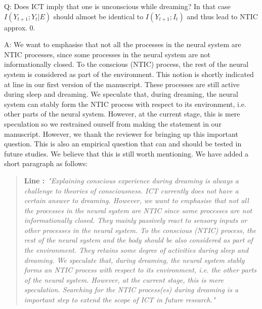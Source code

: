 \documentclass[utf8]{article}
\newcounter{cQuestion}[section]
\newenvironment{question}
    {\refstepcounter{cQuestion}\color{Blue}\noindent\newline Q\thecQuestion:}
    {~\newline}
\newenvironment{ans}  
    {\color{Black}\noindent A:}
    {~\newline}
\newcommand{\addnew}[2]{\blockcquote{}{\textbf{Line #1:}~\newline\textit{"#2"}}
}
\begin{document}
        \begin{question}
            Does ICT imply that one is unconscious while dreaming? In that case $I(Y_{t+1}; Y_t|E)$ should almost be identical to $I(Y_{t+1};I_t)$ and thus lead to NTIC approx. 0.        
        \end{question}
    
    	\begin{ans}
	    	We want to emphasise that not all the processes in the neural system are NTIC processes, since some processes in the neural system are not informationally closed.
	    	To the conscious (NTIC) process, the rest of the neural system is considered as part of the environment. This notion is shortly indicated at line  in our first version of the manuscript. These processes are still active during sleep and dreaming. We speculate that, during dreaming, the neural system can stably form the NTIC process with respect to its environment, i.e. other parts of the neural system.  However, at the current stage, this is mere speculation so we restrained ourself from making the statement in our manuscript. However, we thank the reviewer for bringing up this important question. This is also an empirical question that can and should be tested in future studies. We believe that this is still worth mentioning. We have added a short paragraph as follows:
	    	
			\addnew{}{Explaining conscious experience during dreaming is always a challenge to theories of consciousness. ICT currently does not have a certain answer to dreaming. However, we want to emphasise that not all the processes in the neural system are NTIC since some processes are not informationally closed. They mainly passively react to sensory inputs or other processes in the neural system. To the conscious (NTIC) process, the rest of the neural system and the body should be also considered as part of the environment. They retains some degree of activities during sleep and dreaming. We speculate that, during dreaming, the neural system stably forms an NTIC process with respect to its environment, i.e. the other parts of the neural system. However, at the current stage, this is mere speculation. Searching for the NTIC process(es) during dreaming is a important step to extend the scope of ICT in future research.}
    	\end{ans}
        
\end{document}
